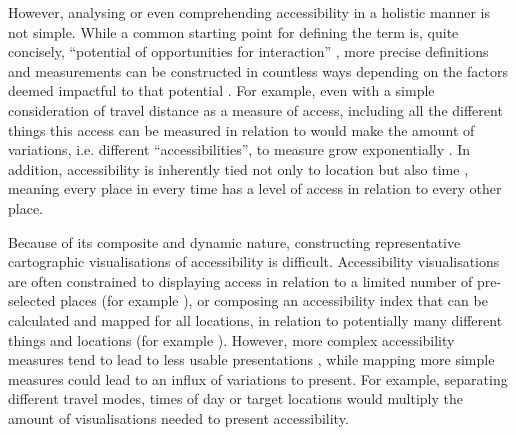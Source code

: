 However, analysing or even comprehending accessibility
in a holistic manner is not simple.
While a common starting point for defining the term is, quite concisely,
\enquote{potential of opportunities for interaction} \parencite{han1959},  %
more precise definitions and measurements can be constructed in countless ways
depending on the factors deemed impactful to that potential
\parencite{pap2016}.
For example, even with a simple consideration of travel distance as a measure of access,
including all the different things this access can be measured in relation to
would make the amount of variations, i.e. different \enquote{accessibilities},
to measure grow exponentially \parencite{lev2020}.
In addition, accessibility is inherently tied not only to location
but also time \parencite{jar2018},
meaning every place in every time has a level of access
in relation to every other place.

Because of its composite and dynamic nature,
constructing representative cartographic visualisations of accessibility is difficult.
Accessibility visualisations are often constrained
to displaying access in relation to
a limited number of pre-selected places (for example \textcite{wei2018}),
or composing an accessibility index
that can be calculated and mapped for all locations,
in relation to potentially many different things and locations
(for example \textcite{kim2019}).
However, more complex accessibility measures tend to lead to
less usable presentations \parencite{te2014},
while mapping more simple measures could lead to an influx of variations to present.
For example, separating different travel modes, times of day or target locations
would multiply the amount of visualisations needed to present accessibility.


